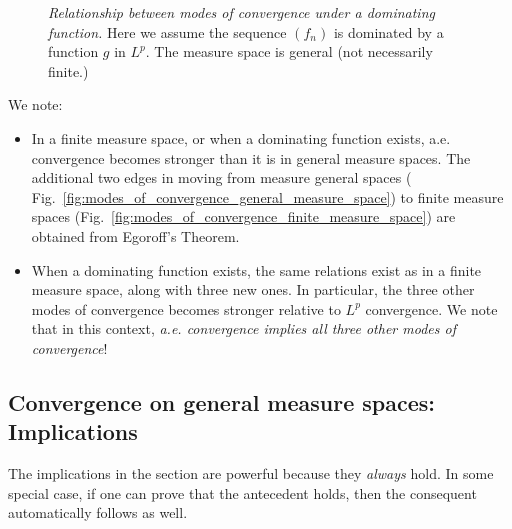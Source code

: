 \documentclass{article} %
\begin{document}
\begin{figure}[H]
\centering	
{}
\caption{ \textit{Relationship between modes of convergence under a dominating function.} Here we assume the sequence $(f_n)$ is dominated by a function $g$ in $L^p$.  The measure space is general (not necessarily finite.)}
\label{fig:modes_of_convergence_under_dominating_function}
\end{figure}

We note:

\begin{itemize}
\item In a finite measure space, or when a dominating function exists, a.e. convergence becomes stronger than it is in general measure spaces. The additional two edges in moving from measure general spaces ( Fig.~\ref{fig:modes_of_convergence_general_measure_space}) to finite measure spaces  (Fig.~\ref{fig:modes_of_convergence_finite_measure_space}) are obtained from Egoroff's Theorem.   
\item When a dominating function exists, the same relations exist as in a finite measure space, along with three new ones.  In particular, the three other modes of convergence becomes stronger relative to $L^p$ convergence.  We note that in this context, \textit{a.e. convergence implies all three other modes of convergence}!
\end{itemize}


\subsection{Convergence on general measure spaces: Implications}

The implications in the section are powerful because they \textit{always} hold. In some special case, if one can prove that the antecedent holds, then the consequent automatically follows as well.
\end{document}
